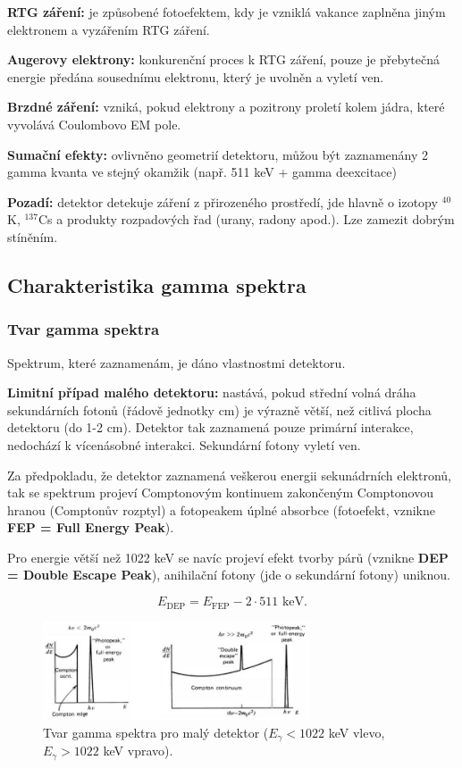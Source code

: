 \textbf{RTG záření:} je způsobené fotoefektem, kdy je vzniklá vakance zaplněna jiným elektronem a vyzářením RTG záření.

\textbf{Augerovy elektrony:} konkurenční proces k RTG záření, pouze je přebytečná energie předána sousednímu elektronu, který je uvolněn a vyletí ven.

\textbf{Brzdné záření:} vzniká, pokud elektrony a pozitrony proletí kolem jádra, které vyvolává Coulombovo EM pole.

\textbf{Sumační efekty:} ovlivněno geometrií detektoru, můžou být zaznamenány 2 gamma kvanta ve stejný okamžik (např. 511 keV + gamma deexcitace)

\textbf{Pozadí:} detektor detekuje záření z přirozeného prostředí, jde hlavně o izotopy $^{40}$K, $^{137}$Cs a produkty rozpadových řad (urany, radony apod.). Lze zamezit dobrým stíněním.

\subsection{Charakteristika gamma spektra}

\subsubsection{Tvar gamma spektra}

Spektrum, které zaznamenám, je dáno vlastnostmi detektoru.

\textbf{Limitní případ malého detektoru:} nastává, pokud střední volná dráha sekundárních fotonů (řádově jednotky cm) je výrazně větší, než citlivá plocha detektoru (do 1-2 cm). Detektor tak zaznamená pouze primární interakce, nedochází k vícenásobné interakci. Sekundární fotony vyletí ven.

Za předpokladu, že detektor zaznamená veškerou energii sekunádrních elektronů, tak se spektrum projeví Comptonovým kontinuem zakončeným Comptonovou hranou (Comptonův rozptyl) a fotopeakem úplné absorbce (fotoefekt, vznikne \textbf{FEP = Full Energy Peak}). 

Pro energie větší než 1022 keV se navíc projeví efekt tvorby párů (vznikne \textbf{DEP = Double Escape Peak}), anihilační fotony (jde o sekundární fotony) uniknou.

$$ E_\text{DEP} = E_\text{FEP} - 2 \cdot 511 \text{ keV}. $$

\begin{figure}[H]
    \centering
    \includegraphics[width=0.7\textwidth]{img/maly_detektor.JPG}
    \caption{Tvar gamma spektra pro malý detektor ($E_\gamma < 1022$ keV vlevo, $E_\gamma > 1022$ keV vpravo).}
\end{figure}

